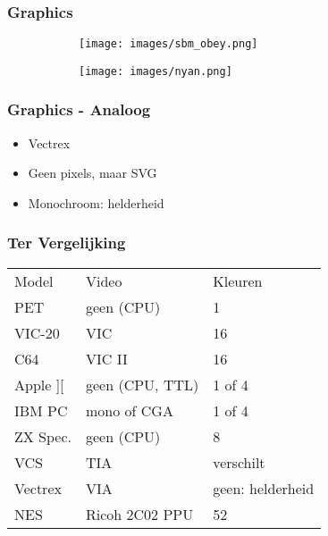 \begin{frame}
\frametitle[fragile]{Graphics}

\begin{figure}
	\begin{subfigure}[b]{0.4\textwidth}
		\texttt{[image: images/sbm\_obey.png]}
	\end{subfigure}
	\begin{subfigure}[b]{0.5\textwidth}
		\texttt{[image: images/nyan.png]}
	\end{subfigure}
\end{figure}

\end{frame}


\begin{frame}
\frametitle{Graphics - Analoog}

\begin{itemize}
\item Vectrex
\item Geen pixels, maar SVG
\item Monochroom: helderheid
\end{itemize}

\end{frame}


\begin{frame}
\frametitle{Ter Vergelijking}

\begin{tabular}{|l|l|l|}
\hline Model & Video & Kleuren \\
PET & geen (CPU) & 1 \\
VIC-20 & VIC & 16 \\
C64 & VIC II & 16 \\
Apple ][ & geen (CPU, TTL) & 1 of 4 \\
IBM PC & mono of CGA & 1 of 4 \\
ZX Spec. & geen (CPU) & 8 \\ \hline
VCS & TIA & verschilt \\
Vectrex & VIA & geen: helderheid \\
NES & Ricoh 2C02 PPU & 52 \\ \hline
\end{tabular}

\end{frame}


